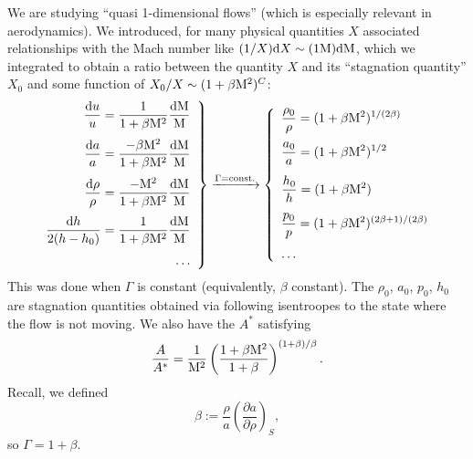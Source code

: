 
\lecture{}

\begin{recall}
We are studying ``quasi 1-dimensional flows'' (which is especially
relevant in aerodynamics).
We introduced, for many physical quantities $X$ associated
relationships with the Mach number like $(1/X)\mathrm{d} X\sim(1\mathrm{M})\mathrm{d}\mathrm{M}$,
which we integrated to obtain a ratio between the quantity $X$ and its
``stagnation quantity'' $X_{0}$ and some function of $X_{0}/X\sim(1+\beta\mathrm{M}^{2})^{C}$:
\begin{equation}
\left.\begin{array}{r}
\displaystyle{\frac{\mathrm{d}u}{u} = \frac{1}{1+\beta\mathrm{M}^{2}}\frac{\mathrm{d}\mathrm{M}}{\mathrm{M}}}\\[12pt]
\displaystyle{\frac{\mathrm{d}a}{a} = \frac{-\beta\mathrm{M}^{2}}{1+\beta\mathrm{M}^{2}}\frac{\mathrm{d}\mathrm{M}}{\mathrm{M}}}\\[12pt]
\displaystyle{\frac{\mathrm{d}\rho}{\rho}=\frac{-\mathrm{M}^{2}}{1+\beta\mathrm{M}^{2}}\frac{\mathrm{d}\mathrm{M}}{\mathrm{M}}}\\[12pt]
\displaystyle{\frac{\mathrm{d}h}{2(h-h_{0})}=\frac{1}{1+\beta\mathrm{M}^{2}}\frac{\mathrm{d}\mathrm{M}}{\mathrm{M}}}\\[12pt]
\dots
\end{array}\right\}\xrightarrow{\Gamma=\text{const.}}
\left\{\begin{array}{l}
\displaystyle{\frac{\rho_{0}}{\rho}=(1+\beta\mathrm{M}^{2})^{1/(2\beta)}}\\[12pt]
\displaystyle{\frac{a_{0}}{a}=(1+\beta\mathrm{M}^{2})^{1/2}}\\[12pt]
\displaystyle{\frac{h_{0}}{h}=(1+\beta\mathrm{M}^{2})}\\[12pt]
\displaystyle{\frac{p_{0}}{p}=(1+\beta\mathrm{M}^{2})^{(2\beta+1)/(2\beta)}}\\[12pt]
\dots
\end{array}\right.
\end{equation}
This was done when $\Gamma$ is constant (equivalently, $\beta$
constant). The $\rho_{0}$, $a_{0}$, $p_{0}$, $h_{0}$ are stagnation
quantities obtained via following isentroopes to the state where the
flow is not moving. We also have the  $A^{*}$
satisfying
\begin{equation}
\frac{A}{A^{*}}=\frac{1}{\mathrm{M}^{2}}\left(\frac{1+\beta\mathrm{M}^{2}}{1+\beta}\right)^{(1+\beta)/\beta}.
\end{equation}
Recall, we defined
\begin{equation}
\beta:=\frac{\rho}{a}\left(\frac{\partial a}{\partial\rho}\right)_{S},
\end{equation}
so $\Gamma=1+\beta$.
\end{recall}

